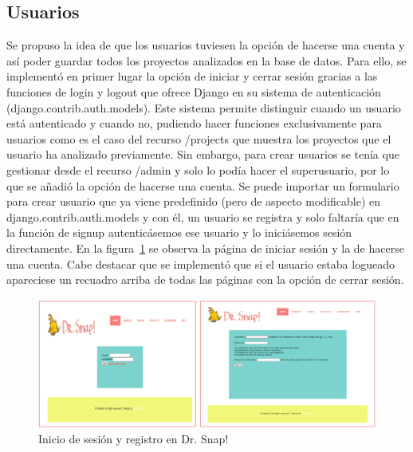 \documentclass[a4paper, 12pt]{book}
\begin{document}
\subsection{Usuarios}
Se propuso la idea de que los usuarios tuviesen la opción de hacerse una cuenta y así poder guardar todos los proyectos analizados en la base de datos. Para ello, se implementó en primer lugar la opción de iniciar y cerrar sesión gracias a las funciones de login y logout que ofrece Django en su sistema de autenticación (django.contrib.auth.models). Este sistema permite distinguir cuando un usuario está autenticado y cuando no, pudiendo hacer funciones exclusivamente para usuarios como es el caso del recurso /projects que muestra los proyectos que el usuario ha analizado previamente. Sin embargo, para crear usuarios se tenía que gestionar desde el recurso /admin y solo lo podía hacer el superusuario, por lo que se añadió la opción de hacerse una cuenta. Se puede importar un formulario para crear usuario que ya viene predefinido (pero de aspecto modificable) en django.contrib.auth.models y con él, un usuario se registra y solo faltaría que en la función de signup autenticásemos ese usuario y lo iniciásemos sesión directamente. En la figura~\ref{figura:sign} se observa la página de iniciar sesión y la de hacerse una cuenta. Cabe destacar que se implementó que si el usuario estaba logueado apareciese un recuadro arriba de todas las  páginas con la opción de cerrar sesión.

\begin{figure}[h]
\centering
            \includegraphics[scale=0.52]{img/sign.PNG}
            \caption{Inicio de sesión y registro en Dr. Snap!}
            \label{figura:sign}
    \end{figure}
\end{document}
